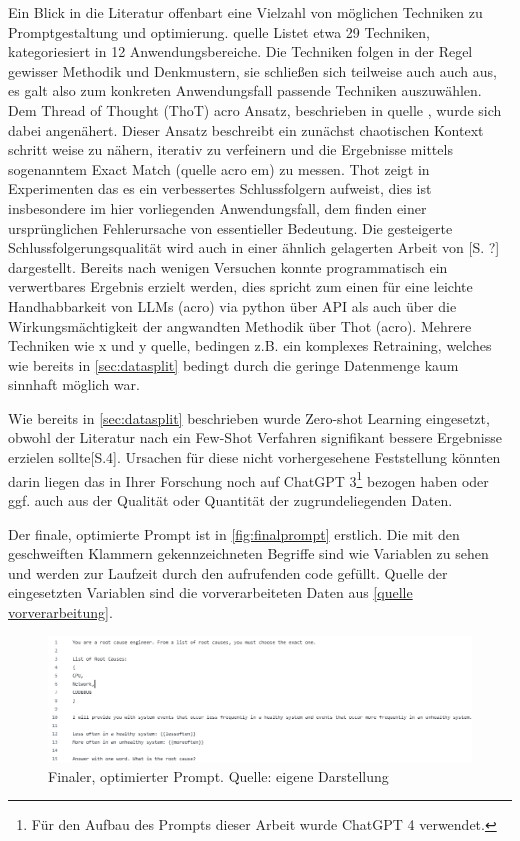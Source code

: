 Ein Blick in die Literatur offenbart eine Vielzahl von möglichen Techniken zu Promptgestaltung und optimierung. quelle Listet etwa 29 Techniken, kategoriesiert in 12 Anwendungsbereiche\autocite[S. 3]{Sahoo2024}. Die Techniken folgen in der Regel gewisser Methodik und Denkmustern, sie schließen sich teilweise auch auch aus, es galt also zum konkreten Anwendungsfall passende Techniken auszuwählen. Dem Thread of Thought (ThoT) acro Ansatz, beschrieben in quelle \autocite{Zhou2023}, wurde sich dabei angenähert. Dieser Ansatz beschreibt ein zunächst chaotischen Kontext schritt weise zu nähern, iterativ zu verfeinern und die Ergebnisse mittels sogenanntem Exact Match (quelle acro em) zu messen. Thot zeigt in Experimenten das es ein verbessertes Schlussfolgern aufweist, dies ist insbesondere im hier vorliegenden Anwendungsfall, dem finden einer ursprünglichen Fehlerursache von essentieller Bedeutung. Die gesteigerte Schlussfolgerungsqualität wird auch in einer ähnlich gelagerten Arbeit von \autocite{Wei2022}[S. ?] dargestellt. Bereits nach wenigen Versuchen konnte programmatisch ein verwertbares Ergebnis erzielt werden, dies spricht zum einen für eine leichte Handhabbarkeit von LLMs (acro) via python über API als auch über die Wirkungsmächtigkeit der angwandten Methodik über Thot (acro). Mehrere Techniken wie x und y quelle, bedingen z.B. ein komplexes Retraining, welches wie bereits in \autoref{sec:datasplit} bedingt durch die geringe Datenmenge kaum sinnhaft möglich war.

Wie bereits in \autoref{sec:datasplit} beschrieben wurde Zero-shot Learning eingesetzt, obwohl der Literatur nach ein Few-Shot Verfahren signifikant bessere Ergebnisse erzielen sollte\autocite{Brown2020}[S.4]. Ursachen für diese nicht vorhergesehene Feststellung könnten darin liegen das \citeauthor{Brown2020} in Ihrer Forschung noch auf ChatGPT 3\footnote{Für den Aufbau des Prompts dieser Arbeit wurde ChatGPT 4 verwendet.} bezogen haben oder ggf. auch aus der Qualität oder Quantität der zugrundeliegenden Daten.

Der finale, optimierte Prompt ist in \autoref{fig:finalprompt} erstlich. Die mit den geschweiften Klammern gekennzeichneten Begriffe sind wie Variablen zu sehen und werden zur Laufzeit durch den aufrufenden code gefüllt. Quelle der eingesetzten Variablen sind die vorverarbeiteten Daten aus \autoref{quelle vorverarbeitung}. 

\begin{figure}
    \centering
    \includegraphics [width=0.5\linewidth] {bilder/finalprompt.png}
    \caption [Finaler, optimierter Prompt]{Finaler, optimierter Prompt. Quelle: eigene Darstellung}
    \label{fig:finalprompt}
\end{figure}




